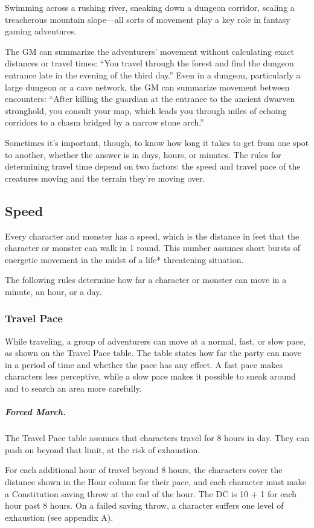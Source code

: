 Swimming across a rushing river, sneaking down a dungeon corridor, scaling a treacherous mountain slope—all sorts of movement play a key role in fantasy gaming adventures.

The GM can summarize the adventurers' movement without calculating exact distances or travel times: “You travel through the forest and find the dungeon entrance late in the evening of the third day.” Even in a dungeon, particularly a large dungeon or a cave network, the GM can summarize movement between encounters: “After killing the guardian at the entrance to the ancient dwarven stronghold, you consult your map, which leads you through miles of echoing corridors to a chasm bridged by a narrow stone arch.”

Sometimes it's important, though, to know how long it takes to get from one spot to another, whether the answer is in days, hours, or minutes. The rules for determining travel time depend on two factors: the speed and travel pace of the creatures moving and the terrain they're moving over.

\subsection{Speed}

Every character and monster has a speed, which is the distance in feet that the character or monster can walk in 1 round. This number assumes short bursts of energetic movement in the midst of a life* threatening situation.

The following rules determine how far a character or monster can move in a minute, an hour, or a day.

\subsubsection{Travel Pace}

While traveling, a group of adventurers can move at a normal, fast, or slow pace, as shown on the Travel Pace table. The table states how far the party can move in a period of time and whether the pace has any effect. A fast pace makes characters less perceptive, while a slow pace makes it possible to sneak around and to search an area more carefully.

\subparagraph*{Forced March.} The Travel Pace table assumes that characters travel for 8 hours in day. They can push on beyond that limit, at the risk of exhaustion.

For each additional hour of travel beyond 8 hours, the characters cover the distance shown in the Hour column for their pace, and each character must make a Constitution saving throw at the end of the hour. The DC is 10 + 1 for each hour past 8 hours. On a failed saving throw, a character suffers one level of exhaustion (see appendix A).


